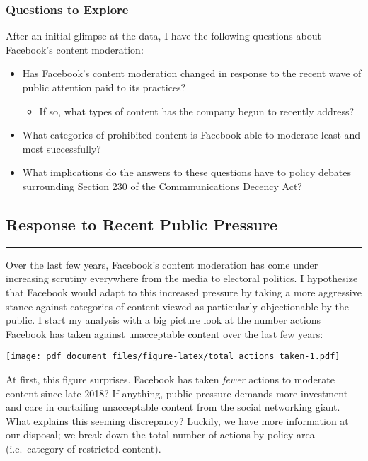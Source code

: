 \documentclass[
]{article}
\providecommand{\tightlist}{%
  \setlength{\itemsep}{0pt}\setlength{\parskip}{0pt}}
\begin{document}
\hypertarget{questions-to-explore}{%
\subsubsection{Questions to Explore}\label{questions-to-explore}}

After an initial glimpse at the data, I have the following questions
about Facebook's content moderation:

\begin{itemize}
\item
  Has Facebook's content moderation changed in response to the recent
  wave of public attention paid to its practices?

  \begin{itemize}
  \tightlist
  \item
    If so, what types of content has the company begun to recently
    address?
  \end{itemize}
\item
  What categories of prohibited content is Facebook able to moderate
  least and most successfully?
\item
  What implications do the answers to these questions have to policy
  debates surrounding Section 230 of the Commmunications Decency Act?
\end{itemize}

\hypertarget{response-to-recent-public-pressure}{%
\subsection{Response to Recent Public
Pressure}\label{response-to-recent-public-pressure}}

\begin{center}\rule{0.5\linewidth}{0.5pt}\end{center}

Over the last few years, Facebook's content moderation has come under
increasing scrutiny everywhere from the media to electoral politics. I
hypothesize that Facebook would adapt to this increased pressure by
taking a more aggressive stance against categories of content viewed as
particularly objectionable by the public. I start my analysis with a big
picture look at the number actions Facebook has taken against
unacceptable content over the last few years:

\texttt{[image: pdf\_document\_files/figure-latex/total actions taken-1.pdf]}

At first, this figure surprises. Facebook has taken \emph{fewer} actions
to moderate content since late 2018? If anything, public pressure
demands more investment and care in curtailing unacceptable content from
the social networking giant. What explains this seeming discrepancy?
Luckily, we have more information at our disposal; we break down the
total number of actions by policy area (i.e.~category of restricted
content).
\end{document}
